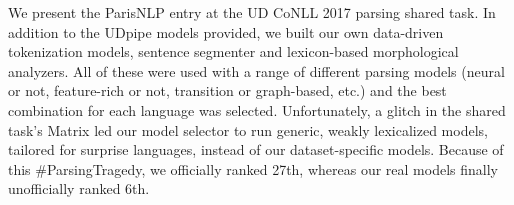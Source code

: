 We present the ParisNLP entry at the UD CoNLL 2017 parsing shared task. In addition to the UDpipe models provided, we built our own data-driven tokenization models, sentence segmenter and lexicon-based morphological analyzers. All of these were used with a range of different parsing models (neural or not, feature-rich or not, transition or graph-based, etc.) and the best combination for each language was selected. Unfortunately, a glitch in the shared task's Matrix led our model selector to run generic, weakly lexicalized models, tailored for surprise languages, instead of our dataset-specific models. Because of this \#ParsingTragedy, we officially ranked 27th, whereas our real models finally unofficially ranked 6th.
